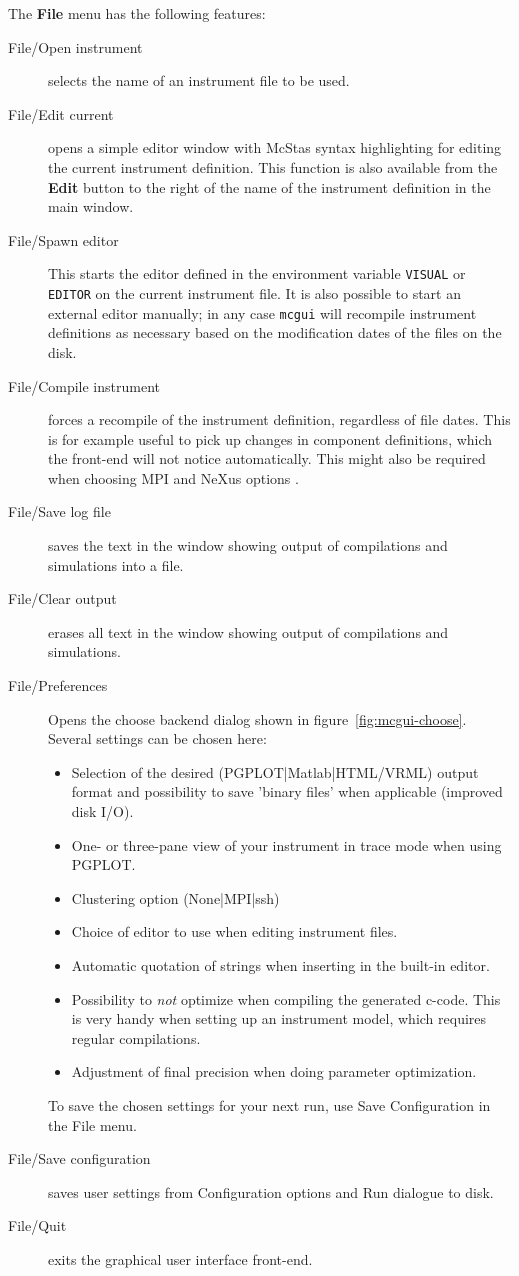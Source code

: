 The {\bf File} menu has the following features:
\begin{description}
\item[File/Open instrument] selects the name of an instrument file to be used.
\item[File/Edit current] opens a simple editor window with McStas syntax
  highlighting for editing the
  current instrument definition. This function is also available from
  the {\bf Edit} button to the right of the name of the instrument definition in
  the main window.
\item[File/Spawn editor] This starts the editor defined in the environment
  variable \verb+VISUAL+ or \verb+EDITOR+ on the current instrument
  file. It is also possible to start an external editor manually; in any
  case \verb+mcgui+ will recompile instrument definitions as necessary based on
  the modification dates of the files on the disk.
\item[File/Compile instrument] forces a recompile of the instrument definition,
  regardless of file dates. This is for example useful to pick up changes in
  component definitions, which the front-end will not notice automatically. This
  might also be required when choosing MPI  and NeXus options
  . 
\item[File/Save log file] saves the text in the window showing output of
  compilations and simulations into a file.
\item[File/Clear output] erases all text in the window showing output of
  compilations and simulations.
  \item[File/Preferences] Opens the choose backend dialog shown in
  figure~\ref{fig:mcgui-choose}. Several settings can be chosen here:
\begin{itemize}
  \item Selection of  the desired (PGPLOT|Matlab|HTML/VRML) output
    format and possibility to save 'binary files' when
  applicable (improved disk I/O).
  \item One- or three-pane view of your instrument in trace mode when
    using PGPLOT.
  \item Clustering option (None|MPI|ssh)
  \item Choice of editor to use when editing instrument files.
  \item Automatic quotation of strings when inserting in the built-in
    editor.
  \item Possibility to \emph{not} optimize when compiling the generated
    c-code. This is very handy when setting up an instrument model, which
    requires regular compilations.
  \item Adjustment of final precision when doing parameter optimization.
\end{itemize}
To save the chosen settings for your next \MCS run, use Save
Configuration in the File menu.
\item[File/Save configuration] saves user settings from Configuration
  options and Run dialogue to disk.
\item[File/Quit] exits the graphical user interface front-end.
\end{description}

